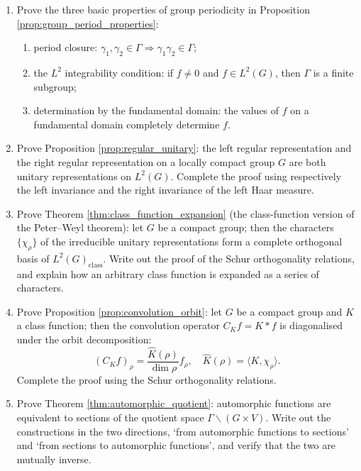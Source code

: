 \begin{enumerate}[leftmargin=3em, label=\textbf{Exercise \arabic*}]
    \item Prove the three basic properties of group periodicity in Proposition \ref{prop:group_period_properties}:
    \begin{enumerate}[label=(\roman*)]
        \item period closure: $\gamma_1,\gamma_2\in\Gamma\Rightarrow\gamma_1\gamma_2\in\Gamma$;
        \item the $L^2$ integrability condition: if $f\neq0$ and $f\in L^2(G)$, then $\Gamma$ is a finite subgroup;
        \item determination by the fundamental domain: the values of $f$ on a fundamental domain completely determine $f$.
    \end{enumerate}

    \item Prove Proposition \ref{prop:regular_unitary}:
    the left regular representation and the right regular representation on a locally compact group $G$ are both unitary representations on $L^2(G)$.
    Complete the proof using respectively the left invariance and the right invariance of the left Haar measure.

    \item Prove Theorem \ref{thm:class_function_expansion} (the class-function version of the Peter--Weyl theorem):
    let $G$ be a compact group; then the characters $\{\chi_\rho\}$ of the irreducible unitary representations form
    a complete orthogonal basis of $L^2(G)_{\text{class}}$.
    Write out the proof of the Schur orthogonality relations, and explain how an arbitrary class function is expanded as a series of characters.

    \item Prove Proposition \ref{prop:convolution_orbit}:
    let $G$ be a compact group and $K$ a class function; then the convolution operator $C_K f=K*f$ is diagonalised under the orbit decomposition:
    \[
    (C_K f)_\rho=\frac{\hat{K}(\rho)}{\dim\rho}f_\rho,
    \quad
    \hat{K}(\rho)=\langle K,\chi_\rho\rangle.
    \]
    Complete the proof using the Schur orthogonality relations.

    \item Prove Theorem \ref{thm:automorphic_quotient}:
    automorphic functions are equivalent to sections of the quotient space $\Gamma\backslash(G\times V)$.
    Write out the constructions in the two directions, `from automorphic functions to sections' and `from sections to automorphic functions',
    and verify that the two are mutually inverse.


\end{enumerate}
